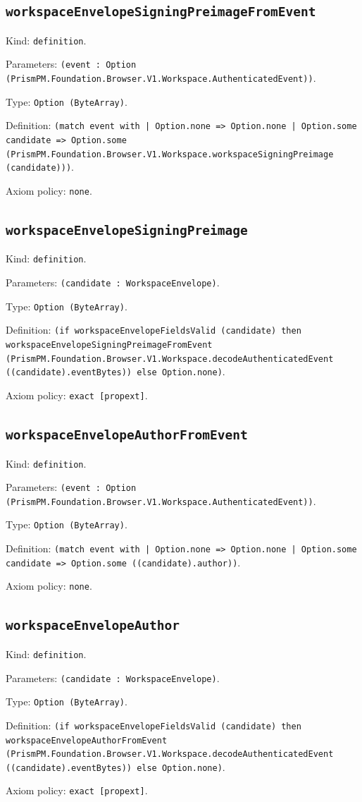 \documentclass[11pt]{article}
\begin{document}
\subsection*{\texttt{workspaceEnvelopeSigningPreimageFromEvent}}
\noindent Kind: \texttt{definition}.\par
\noindent Parameters: \texttt{(event : Option (PrismPM.Foundation.Browser.V1.Workspace.AuthenticatedEvent))}.\par
\noindent Type: \texttt{Option (ByteArray)}.\par
\noindent Definition: \texttt{(match event with | Option.none => Option.none | Option.some candidate => Option.some (PrismPM.Foundation.Browser.V1.Workspace.workspaceSigningPreimage (candidate)))}.\par
\noindent Axiom policy: \texttt{none}.\par
\subsection*{\texttt{workspaceEnvelopeSigningPreimage}}
\noindent Kind: \texttt{definition}.\par
\noindent Parameters: \texttt{(candidate : WorkspaceEnvelope)}.\par
\noindent Type: \texttt{Option (ByteArray)}.\par
\noindent Definition: \texttt{(if workspaceEnvelopeFieldsValid (candidate) then workspaceEnvelopeSigningPreimageFromEvent (PrismPM.Foundation.Browser.V1.Workspace.decodeAuthenticatedEvent ((candidate).eventBytes)) else Option.none)}.\par
\noindent Axiom policy: \texttt{exact [propext]}.\par
\subsection*{\texttt{workspaceEnvelopeAuthorFromEvent}}
\noindent Kind: \texttt{definition}.\par
\noindent Parameters: \texttt{(event : Option (PrismPM.Foundation.Browser.V1.Workspace.AuthenticatedEvent))}.\par
\noindent Type: \texttt{Option (ByteArray)}.\par
\noindent Definition: \texttt{(match event with | Option.none => Option.none | Option.some candidate => Option.some ((candidate).author))}.\par
\noindent Axiom policy: \texttt{none}.\par
\subsection*{\texttt{workspaceEnvelopeAuthor}}
\noindent Kind: \texttt{definition}.\par
\noindent Parameters: \texttt{(candidate : WorkspaceEnvelope)}.\par
\noindent Type: \texttt{Option (ByteArray)}.\par
\noindent Definition: \texttt{(if workspaceEnvelopeFieldsValid (candidate) then workspaceEnvelopeAuthorFromEvent (PrismPM.Foundation.Browser.V1.Workspace.decodeAuthenticatedEvent ((candidate).eventBytes)) else Option.none)}.\par
\noindent Axiom policy: \texttt{exact [propext]}.\par
\end{document}
